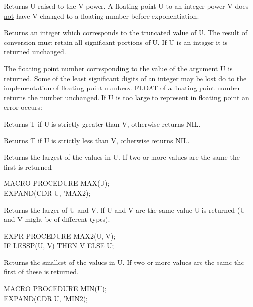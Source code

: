 {Returns U raised to the V power. A floating point U to an integer
power V does \underline{not} have V changed to a floating number
before exponentiation.}


{Returns an integer which corresponds to the truncated value of U. The
result of conversion must retain all significant portions of U. If U
is an integer it is returned unchanged. }


{The floating point number corresponding to the value of the argument
U is returned. Some of the least significant digits of an integer may
be lost do to the implementation of floating point numbers. FLOAT of a
floating point number returns the number unchanged. If U is too large
to represent in floating point an error occurs:

}

{Returns T if U is strictly greater than V, otherwise returns NIL.}


{Returns T if U is strictly less than V, otherwise returns NIL. }


{Returns the largest of the values in U. If two or more values are the
same the first is returned.

{\tt \begin{tabbing} MACRO PROCEDURE MAX(U); \\
\hspace*{1em} EXPAND(CDR U, 'MAX2);
\end{tabbing}}}


{Returns the larger of U and V. If U and V are the same value U is
returned (U and V might be of different types).

{\tt \begin{tabbing} EXPR PROCEDURE MAX2(U, V); \\
\hspace*{1em} IF LESSP(U, V) THEN V ELSE U;
\end{tabbing}}}


{Returns the smallest of the values in U. If two or more values are
the same the first of these is returned.

{\tt \begin{tabbing} MACRO PROCEDURE MIN(U); \\
\hspace*{1em} EXPAND(CDR U, 'MIN2);
\end{tabbing}}}


